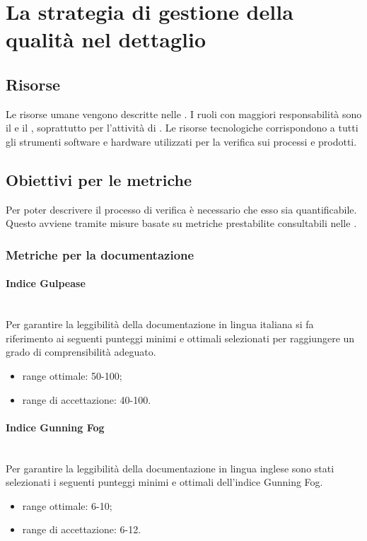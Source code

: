 \section{La strategia di gestione della qualità nel dettaglio}

\subsection{Risorse}
Le risorse umane vengono descritte nelle \NormeDiProgetto{}. I ruoli con maggiori responsabilità sono il \Responsabile{} e il \Verificatore{}, soprattutto per l'attività di \VV{}.
Le risorse tecnologiche corrispondono a tutti gli strumenti software e hardware utilizzati per la verifica sui processi e prodotti.

\subsection{Obiettivi per le metriche}\label{sec:metriche}
Per poter descrivere il processo di verifica è necessario che esso sia quantificabile. Questo avviene tramite misure basate su metriche prestabilite consultabili nelle \NormeDiProgetto{}.

\subsubsection{Metriche per la documentazione}\label{sec:metriche_documentazione}
\paragraph{Indice Gulpease}\mbox{}\\
Per garantire la leggibilità della documentazione in lingua italiana si fa riferimento ai seguenti punteggi minimi e ottimali selezionati per raggiungere un grado di comprensibilità adeguato.
\begin{itemize}
	\item range ottimale: 50-100;
	\item range di accettazione: 40-100.
\end{itemize} 

\paragraph{Indice Gunning Fog}\mbox{}\\
Per garantire la leggibilità della documentazione in lingua inglese sono stati selezionati i seguenti punteggi minimi e ottimali dell'indice Gunning Fog.
\begin{itemize}
	\item range ottimale: 6-10;
	\item range di accettazione: 6-12.
\end{itemize}

